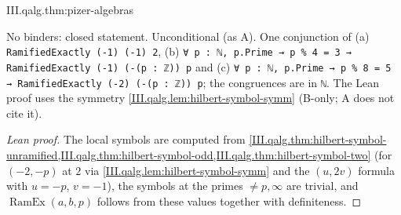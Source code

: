 \begin{theorem}
\end{theorem}
\begin{tfformal}{III.qalg.thm:pizer-algebras}
\begin{tffidelity}
No binders: closed statement. Unconditional (as A). One conjunction of (a) \texttt{RamifiedExactly (-1) (-1) 2}, (b) \texttt{∀ p : ℕ, p.Prime → p \% 4 = 3 → RamifiedExactly (-1) (-(p : ℤ)) p} and (c) \texttt{∀ p : ℕ, p.Prime → p \% 8 = 5 → RamifiedExactly (-2) (-(p : ℤ)) p}; the congruences are in \texttt{ℕ}. The Lean proof uses the symmetry \cref{III.qalg.lem:hilbert-symbol-symm} (B-only; A does not cite it).
\end{tffidelity}
\end{tfformal}
\begin{proof}[Lean proof]
The local symbols are computed from \cref{III.qalg.thm:hilbert-symbol-unramified,III.qalg.thm:hilbert-symbol-odd,III.qalg.thm:hilbert-symbol-two} (for $(-2,-p)$ at $2$ via \cref{III.qalg.lem:hilbert-symbol-symm} and the $(u,2v)$ formula with $u=-p$, $v=-1$), the symbols at the primes $\ne p,\infty$ are trivial, and $\operatorname{RamEx}(a,b,p)$ follows from these values together with definiteness.
\end{proof}

